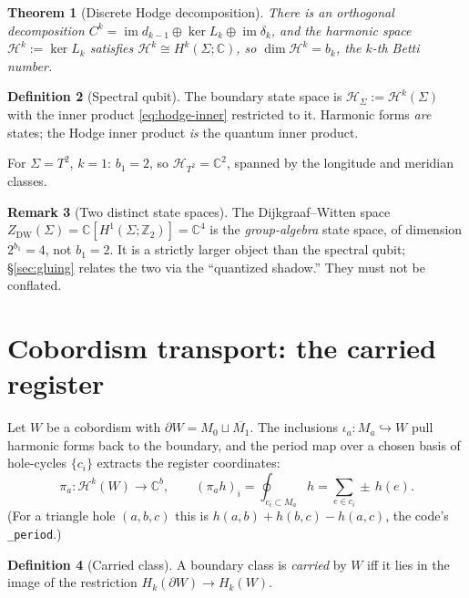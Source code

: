 \documentclass[11pt]{article}
\DeclareMathOperator{\im}{im}
\newcommand{\HH}{\mathcal{H}}
\newcommand{\C}{\mathbb{C}}
\newcommand{\Z}{\mathbb{Z}}
\newcommand{\bd}{\partial}
\newcommand{\harm}{\mathcal{H}}              %
\newcommand{\Zdw}{Z_{\mathrm{DW}}}
\newcommand{\code}[1]{\texttt{#1}}
\theoremstyle{plain}
\newtheorem{theorem}{Theorem}[section]
\theoremstyle{definition}
\newtheorem{definition}[theorem]{Definition}
\newtheorem{remark}[theorem]{Remark}
\begin{document}
\begin{theorem}[Discrete Hodge decomposition]
\label{thm:hodge}
There is an orthogonal decomposition $C^k = \im d_{k-1} \oplus \ker L_k \oplus \im \delta_k$,
and the harmonic space $\harm^k:=\ker L_k$ satisfies $\harm^k \cong H^k(\Sigma;\C)$, so
$\dim\harm^k = b_k$, the $k$-th Betti number.
\end{theorem}

\begin{definition}[Spectral qubit]
The boundary state space is $\HH_\Sigma := \harm^k(\Sigma)$ with the inner product
\eqref{eq:hodge-inner} restricted to it. Harmonic forms \emph{are} states; the Hodge inner
product \emph{is} the quantum inner product.
\end{definition}

For $\Sigma=T^2$, $k=1$: $b_1=2$, so $\HH_{T^2}=\C^2$, spanned by the longitude and meridian
classes.

\begin{remark}[Two distinct state spaces]
The Dijkgraaf--Witten space $\Zdw(\Sigma)=\C[H^1(\Sigma;\Z_2)]=\C^4$ is the \emph{group-algebra}
state space, of dimension $2^{b_1}=4$, not $b_1=2$. It is a strictly larger object than the
spectral qubit; \S\ref{sec:gluing} relates the two via the ``quantized shadow.'' They must not
be conflated.
\end{remark}

\section{Cobordism transport: the carried register}
\label{sec:transport}

Let $W$ be a cobordism with $\bd W = M_0 \sqcup \overline{M_1}$. The inclusions
$\iota_a:M_a\hookrightarrow W$ pull harmonic forms back to the boundary, and the period map
over a chosen basis of hole-cycles $\{c_i\}$ extracts the register coordinates:
\begin{equation}
  \pi_a:\harm^k(W)\to\C^{b},\qquad (\pi_a h)_i = \oint_{c_i\subset M_a} h
       = \sum_{e\in c_i}\pm\,h(e).
  \label{eq:period}
\end{equation}
(For a triangle hole $(a,b,c)$ this is $h(a,b)+h(b,c)-h(a,c)$, the code's \code{\_period}.)

\begin{definition}[Carried class]
A boundary class is \emph{carried} by $W$ iff it lies in the image of the restriction
$H_k(\bd W)\to H_k(W)$.
\end{definition}
\end{document}

